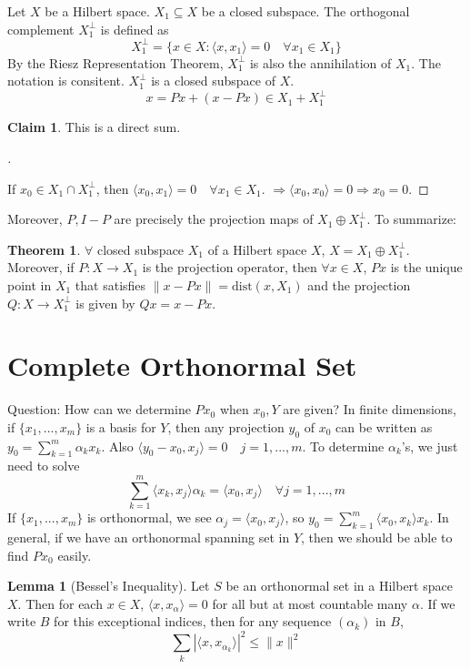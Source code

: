 \documentclass{article}
\theoremstyle{definition}
\newtheorem{thm}{Theorem}
\newtheorem{lem}{Lemma}
\newtheorem*{clm}{Claim}
\newenvironment{proofs}[1][\proofname]{%
  \begin{proof}[#1]$ $\par\nobreak\ignorespaces
}{%
  \end{proof}
}
\begin{document}
Let $X$ be a Hilbert space.
$X_1 \subseteq X$ be a closed subspace.
The orthogonal complement $X_1^\perp$ is defined as 
\[
	X_1^\perp = \{x \in X: \langle x, x_1 \rangle = 0 \quad \forall x_1 \in X_1\}
\]
By the Riesz Representation Theorem, $X_1^\perp$ is also the annihilation of $X_1$.
The notation is consitent.
$X_1^\perp$ is a closed subspace of $X$.
\[
	x = P x + (x - P x) \in X_1 + X_1^\perp
\]
\begin{clm}
	This is a direct sum.
\end{clm}

\begin{proofs}
	If $x_0 \in X_1 \cap X_1^\perp$, then $\langle x_0, x_1 \rangle = 0 \quad \forall x_1 \in X_1$.
	$\Rightarrow \langle x_0, x_0 \rangle = 0 \Rightarrow x_0 = 0$.
\end{proofs}
Moreover, $P, I - P$ are precisely the projection maps of $X_1 \oplus X_1^\perp$.
To summarize:
\begin{thm}
	$\forall$ closed subspace $X_1$ of a Hilbert space $X$, $X = X_1 \oplus X_1^\perp$.
	Moreover, if $P: X \to X_1$ is the projection operator, then $\forall x \in X$, $P x$ is the unique point in $X_1$ that satisfies $\|x - Px\| = \text{dist}(x, X_1)$ and the projection $Q: X \to X_1^\perp$ is given by $Q x = x - P x$.
\end{thm}

\section{Complete Orthonormal Set}

Question: How can we determine $P x_0$ when $x_0, Y$ are given?
In finite dimensions, if $\{x_1, ..., x_m\}$ is a basis for $Y$, then any projection $y_0$ of $x_0$ can be written as $y_0 = \sum_{k = 1}^m \alpha_k x_k$.
Also $\langle y_0 - x_0, x_j \rangle = 0 \quad j = 1, ..., m$.
To determine $\alpha_k$'s, we just need to solve
\[
	\sum_{k = 1}^m \langle x_k, x_j \rangle \alpha_k = \langle x_0, x_j \rangle \quad \forall j = 1, ..., m
\]
If $\{x_1, ..., x_m\}$ is orthonormal, we see $\alpha_j = \langle x_0, x_j \rangle$, so $y_0 = \sum_{k = 1}^m \langle x_0, x_k \rangle x_k$.
In general, if we have an orthonormal spanning set in $Y$, then we should be able to find $P x_0$ easily.

\begin{lem}[Bessel's Inequality]
	Let $S$ be an orthonormal set in a Hilbert space $X$.
	Then for each $x \in X$, $\langle x, x_\alpha \rangle = 0$ for all but at most countable many $\alpha$.
	If we write $B$ for this exceptional indices, then for any sequence $(\alpha_k)$ in $B$, 
	\[
		\sum_k |\langle x, x_{\alpha_k} \rangle|^2 \leq \|x\|^2
	\]
\end{lem}
\end{document}
